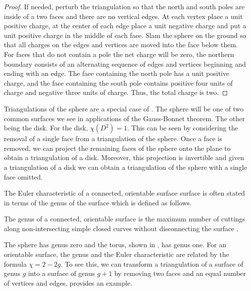 \begin{proof}
If needed, perturb the triangulation so that the north and south poles are 
inside of a two faces and there are no vertical edges. At each vertex place a unit positive
charge, at the center of each edge place a unit negative charge and put a unit positive
charge in the middle of each face. Slam the sphere on the ground so that all charges
on the edges and vertices are moved into the face below them. For faces that do not contain a pole
the net charge will be zero, the northern boundary consists of an alternating sequence
of edges and vertices  beginning  and ending with an edge.
The face containing the north pole has a unit positive charge, and the face containing the south
pole contains positive four units of charge and negative three units of charge.
Thus, the total charge is two.

\end{proof}

Triangulations of the sphere are a special case of .
The sphere will be one of two common surfaces we see in applications
of the Gauss-Bonnet theorem. The other being the disk.
For the disk, $\chi(D^2)=1$. This can be seen by considering
the removal of a single face from a triangulation of the sphere.
Once a face is removed, we can project the remaining faces of the sphere
onto the plane to obtain a triangulation of a disk. Moreover, this projection
is invertible and given a triangulation of a disk we can obtain a triangulation
of the sphere with a single face omitted.

The Euler characteristic of a connected, orientable surface surface is often 
stated in terms of the genus of the surface which is defined as follows.
\begin{definition}\label{def:genus}
	The genus of a connected, orientable surface is the maximum number of
	cuttings along non-intersecting simple closed curves without disconnecting
	the surface \cite{munkres}.
\end{definition}

The sphere has genus zero and the torus, shown in , has genus one.
For an orientable surface, the genus and the Euler characteristic are related by
the formula $\chi=2-2g$. To see this, we can transform a triangulation of a surface of
genus $g$ into a surface of genus $g+1$ by removing two faces and an equal number
of vertices and edges.  provides an example.




